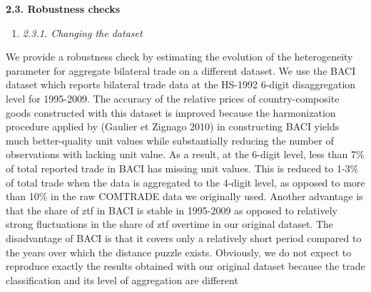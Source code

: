 \documentclass[12pt,twoside,a4paper,notitlepage]{article}
\begin{document}
\textbf{2.3. Robustness checks\label{mark-2.3.}}

\begin{enumerate}[{2.3}.1]

\item \textit{2.3.1. Changing the dataset\label{mark-2.3.1.}}

\end{enumerate}

We provide a robustness check by estimating the evolution of the heterogeneity parameter for aggregate bilateral trade on a different dataset. We use the BACI dataset which reports bilateral trade data at the HS-1992 6-digit disaggregation level for 1995-2009. The accuracy of the relative prices of country-composite goods constructed with this dataset is improved because the harmonization procedure applied by (Gaulier et Zignago 2010) in constructing BACI yields much better-quality unit values while substantially reducing the number of observations with lacking unit value. As a result, at the 6-digit level, less than 7\% of total reported trade in BACI has missing unit values. This is reduced to 1-3\% of total trade when the data is aggregated to the 4-digit level, as opposed to more than 10\% in the raw COMTRADE data we originally used. Another advantage is that the share of ztf in BACI is stable in 1995-2009 as opposed to relatively strong fluctuations in the share of ztf overtime in our original dataset. The disadvantage of BACI is that it covers only a relatively short period compared to the years over which the distance puzzle exists. Obviously, we do not expect to reproduce exactly the results obtained with our original dataset because the trade classification and its level of aggregation are different%
\end{document}
